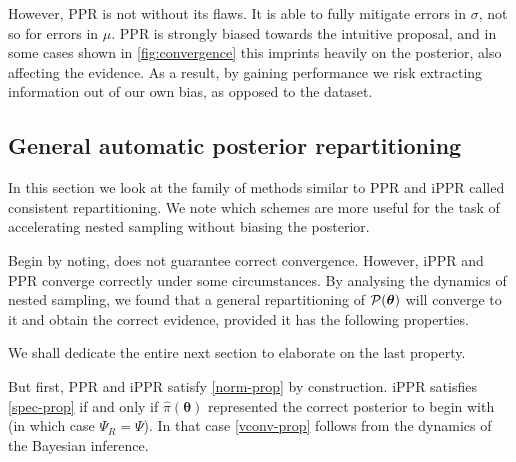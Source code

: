 \documentclass[usenatbib]{mnras}
\begin{document}
However, PPR is not without its flaws. It is able to fully mitigate
errors in $\sigma$, not so for errors in $\mu$. PPR is strongly biased
towards the intuitive proposal, and in some cases shown in
\cref{fig:convergence} this imprints heavily on the posterior, also
affecting the evidence. As a result, by gaining performance we risk
extracting information out of our own bias, as opposed to the dataset.



\subsection{General automatic posterior repartitioning}

In this section we look at the family of methods similar to PPR and
iPPR called consistent repartitioning. We note which schemes are more
useful for the task of accelerating nested sampling without biasing
the posterior.

Begin by noting,  does not guarantee correct
convergence. However, iPPR and PPR converge correctly under some
circumstances. By analysing the dynamics of nested sampling, we found
that a general repartitioning of \( {\cal P}(\bm{\theta})\) will
converge to it and obtain the correct evidence, provided it has the
following properties.
We shall dedicate the entire next section to elaborate on the last
property.

But first, PPR and iPPR satisfy \cref{norm-prop} by construction. iPPR
satisfies \cref{spec-prop} if and only if
\( \hat{\pi} (\bm{\theta})\) represented the correct posterior to
begin with (in which case $\Psi_{R} = \Psi$). In that case
\cref{vconv-prop} follows from the dynamics of the Bayesian inference.
\end{document}
